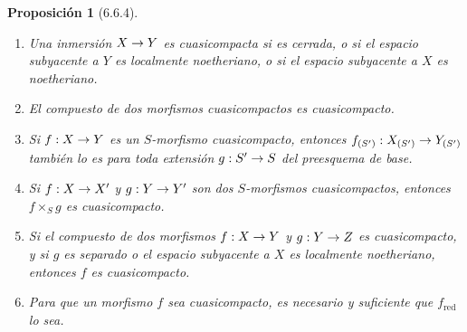 \documentclass[oneside]{amsart}
\theoremstyle{ega-env-style}
\theoremstyle{ega-thm-env-style}
\newtheorem*{proposition}{Proposición}
\theoremstyle{ega-defn-env-style}
\renewcommand{\to}{\mathchoice{\longrightarrow}{\rightarrow}{\rightarrow}{\rightarrow}}
\let\EGAOriginalLabel\label
\renewcommand{\label}[1]{\phantomsection\EGAOriginalLabel{#1}}
\begin{document}
\begin{proposition}[6.6.4]
\label{I.6.6.4}
\medskip\noindent
\begin{enumerate}
  \item[{\rm(i)}] Una inmersión $X\to Y$ es cuasicompacta si es cerrada, o si el espacio subyacente a $Y$ es localmente noetheriano, o si el espacio subyacente a $X$ es noetheriano.
  \item[{\rm(ii)}] El compuesto de dos morfismos cuasicompactos es cuasicompacto.
  \item[{\rm(iii)}] Si $f:X\to Y$ es un $S$-morfismo cuasicompacto, entonces $f_{(S')}:X_{(S')}\to Y_{(S')}$ también lo es para toda extensión $g:S'\to S$ del preesquema de base.
  \item[{\rm(iv)}] Si $f:X\to X'$ y $g:Y\to Y'$ son dos $S$-morfismos cuasicompactos, entonces $f\times_S g$ es cuasicompacto.
  \item[{\rm(v)}] Si el compuesto de dos morfismos $f:X\to Y$ y $g:Y\to Z$ es cuasicompacto, y si $g$ es separado o el espacio subyacente a $X$ es localmente noetheriano, entonces $f$ es cuasicompacto.
  \item[{\rm(vi)}] Para que un morfismo $f$ sea cuasicompacto, es necesario y suficiente que $f_{\mathrm{red}}$ lo sea.
\end{enumerate}
\end{proposition}
\end{document}
